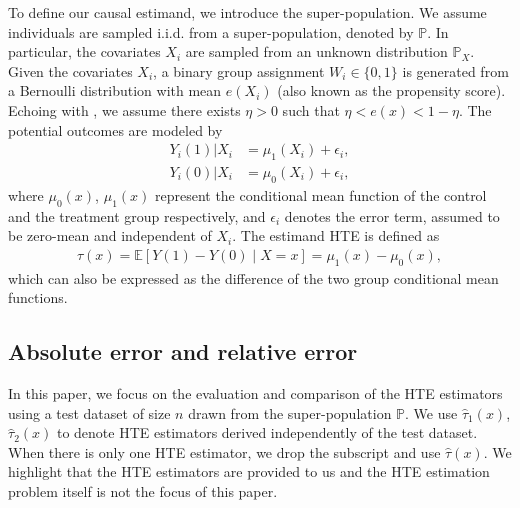 \documentclass{article}
\theoremstyle{plain}
\theoremstyle{definition}
\def\EE{\mathbb{E}}
\def\PP{\mathbb{P}}
\theoremstyle{plain}
\begin{document}
To define our causal estimand, we introduce the super-population. 
We assume individuals are sampled i.i.d. from a super-population, denoted by $\PP$.
In particular, the covariates $X_i$ are sampled from an unknown distribution $\PP_X$. 
Given the covariates $X_i$, a binary group assignment $W_i \in \{0, 1\}$ is generated from a Bernoulli distribution with mean $e(X_i)$ (also known as the propensity score). 
Echoing with , we assume there exists $\eta > 0$  such that $\eta < e(x) < 1 - \eta$.
The potential outcomes are modeled by
\begin{align*}
    Y_i(1) | X_i &= \mu_1(X_i) + \epsilon_i, \\
    Y_i(0) | X_i &= \mu_0(X_i) + \epsilon_i,  
\end{align*}
where $\mu_0(x)$, $\mu_1(x)$ represent the conditional mean function of the control and the treatment group respectively, and $\epsilon_i$ denotes the error term, assumed to be zero-mean and independent of $X_i$. 
The estimand HTE is defined as 
\begin{align*}
    \tau(x) = \EE\left[Y(1) - Y(0) \mid X = x\right] 
    = \mu_1(x) - \mu_0(x),
\end{align*}
which can also be expressed as the difference of the two group conditional mean functions.



\subsection{Absolute error and relative error}\label{sec:error.definition}

In this paper, we focus on the evaluation and comparison of the HTE estimators using a test dataset of size $n$ drawn from the super-population $\PP$.
We use $\hat{\tau}_1(x)$, $\hat{\tau}_2(x)$ to denote HTE estimators derived independently of the test dataset.
When there is only one HTE estimator, we drop the subscript and use $\hat{\tau}(x)$.
We highlight that the HTE estimators are provided to us and the HTE estimation problem itself is not the focus of this paper.
\end{document}
